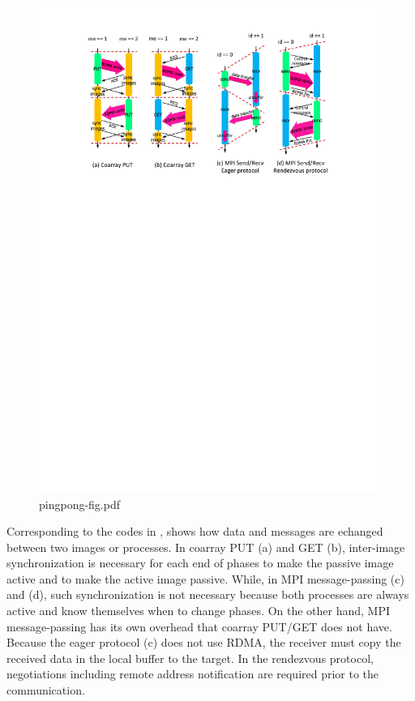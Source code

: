 \begin{figure}[bht]
  \begin{center}
    \mbox{\includegraphics[trim=30mm 195mm 32mm 16mm, scale=0.75,clip]{figs/pingpong-fig-r2.pdf}}
    \caption{pingpong-fig.pdf}\label{fig:pingpong-fig}
  \end{center}
\end{figure}

Corresponding to the codes in ,  shows how data and 
messages are echanged between two images or processes.
In coarray PUT (a) and GET (b), inter-image synchronization is necessary for each end of 
phases to make the passive image active and to make the active image passive.
While, in MPI message-passing (c) and (d), such synchronization is not necessary because
both processes are always active and know themselves when to change phases.
%
On the other hand, MPI message-passing has its own overhead that coarray PUT/GET
does not have. Because the eager protocol (c) does not use RDMA, the receiver
must copy the received data in the local buffer to the target.
In the rendezvous protocol, negotiations including remote address notification
are required prior to the communication.


